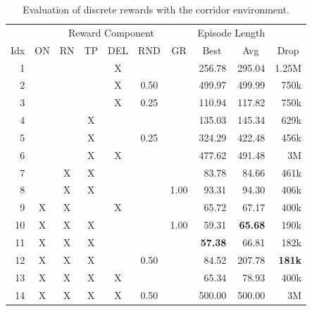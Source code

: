 \begin{table}[htp]
    \begin{center}
        \begin{tabular}{rccccccrrr}
            \toprule
             & \multicolumn{6}{c}{Reward Component} & \multicolumn{2}{c}{Episode Length} & \\
            \cmidrule(lr){2-7}\cmidrule(lr){8-9}
            \multicolumn{1}{c}{Idx} & \multicolumn{1}{c}{ON} & \multicolumn{1}{c}{RN} & \multicolumn{1}{c}{TP} & \multicolumn{1}{c}{DEL} & \multicolumn{1}{c}{RND} & \multicolumn{1}{c}{GR} & \multicolumn{1}{c}{Best} & \multicolumn{1}{c}{Avg} & \multicolumn{1}{c}{Drop}\\
            \midrule
            1 &  &  &  & X &  &  & 256.78 & 295.04 & 1.25M \\
            2 &  &  &  & X & 0.50 &  & 499.97 & 499.99 & 750k \\
            3 &  &  &  & X & 0.25 &  & 110.94 & 117.82 & 750k \\
            4 &  &  & X &  &  &  & 135.03 & 145.34 & 629k \\
            5 &  &  & X &  & 0.25 &  & 324.29 & 422.48 & 456k \\
            6 &  &  & X & X &  &  & 477.62 & 491.48 & 3M \\
            7 &  & X & X &  &  &  & 83.78 & 84.66 & 461k \\
            8 &  & X & X &  &  & 1.00 & 93.31 & 94.30 & 406k \\
            9 & X & X &  & X &  &  & 65.72 & 67.17 & 400k \\
            10 & X & X & X &  &  & 1.00 & 59.31 & \textbf{65.68} & 190k \\
            11 & X & X & X &  &  &  & \textbf{57.38} & 66.81 & 182k \\
            12 & X & X & X &  & 0.50 &  & 84.52 & 207.78 & \textbf{181k} \\
            13 & X & X & X & X &  &  & 65.34 & 78.93 & 400k \\
            14 & X & X & X & X & 0.50 &  & 500.00 & 500.00 & 3M \\
            \bottomrule
        \end{tabular}
    \end{center}
    \caption[Evaluation of Discrete Reward Evaluation with the Corridor Environment]{Evaluation of discrete rewards with the corridor environment.} \label{tab:Maze0318/Reward/Discrete}
\end{table}


